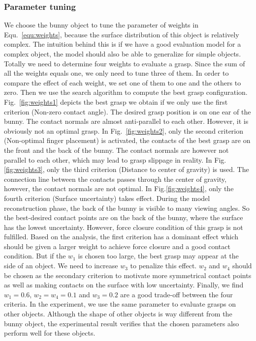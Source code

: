 \subsubsection{Parameter tuning}
We choose the bunny object to tune the parameter of weights in Equ.~\ref{equ:weights}, because the surface distribution of this object is relatively complex. The intuition behind this is if we have a good evaluation model for a complex object, the model should also be able to generalize for simple objects.  Totally we need to determine four weights to evaluate a grasp. Since the sum of all the weights equals one, we only need to tune three of them. In order to compare the effect of each weight, we set one of them to one and the others to zero. Then we use the search algorithm to compute the best grasp configuration. Fig.~\ref{fig:weights1} depicts the best grasp we obtain if we only use the first criterion (Non-zero contact angle). The desired grasp position is on one ear of the bunny. The contact normals are almost anti-parallel to each other. However, it is obviously not an optimal grasp. In Fig.~\ref{fig:weights2}, only the second criterion (Non-optimal finger placement) is activated, the contacts of the best grasp are on the front and the back of the bunny. The contact normals are however not parallel to each other, which may lead to grasp slippage in reality. In Fig.\ref{fig:weights3}, only the third criterion (Distance to center of gravity) is used. The connection line between the contacts passes through the center of gravity, however, the contact normals are not optimal. In Fig.\ref{fig:weights4}, only the fourth criterion (Surface uncertainty) takes effect. During the model reconstruction phase, the back of the bunny is visible to many viewing angles. So the best-desired contact points are on the back of the bunny, where the surface has the lowest uncertainty. However, force closure condition of this grasp is not fulfilled. Based on the analysis, the first criterion has a dominant effect which should be given a larger weight to achieve force closure and a good contact condition. But if the $w_1$ is chosen too large, the best grasp may appear at the side of an object. We need to increase $w_3$ to penalize this effect. $w_2$ and $w_4$ should be chosen as the secondary criterion to motivate more symmetrical contact points as well as making contacts on the surface with low uncertainty. Finally, we find $w_1= 0.6$, $w_2 = w_4 = 0.1$ and $w_3 = 0.2$ are a good trade-off between the four criteria. In the experiment, we use the same parameter to evaluate grasps on other objects. Although the shape of other objects is way different from the bunny object, the experimental result verifies that the chosen parameters also perform well for these objects.

